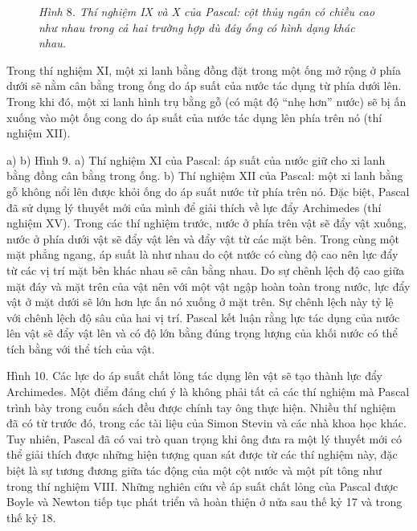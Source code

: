 \begin{multicols}{2}
\begin{figure}[H]
		\caption{\small\textit{\color{timhieukhoahoc}Hình $8$. Thí nghiệm IX và X của Pascal: cột thủy ngân có chiều cao như nhau trong cả hai trường hợp dù đáy ống có hình dạng khác nhau.}}
		\vspace*{-10pt}
	\end{figure}
	Trong thí nghiệm XI, một xi lanh bằng đồng đặt trong một ống mở rộng ở phía dưới sẽ nằm cân bằng trong ống do áp suất của nước tác dụng từ phía dưới lên. Trong khi đó, một xi lanh hình trụ bằng gỗ (có mật độ “nhẹ hơn” nước) sẽ bị ấn xuống vào một ống cong do áp suất của nước tác dụng lên phía trên nó (thí nghiệm XII). 
	
	a)					b)
	Hình 9. a) Thí nghiệm XI của Pascal: áp suất của nước giữ cho xi lanh bằng đồng cân bằng trong ống. b) Thí nghiệm XII của Pascal: một xi lanh bằng gỗ không nổi lên được khỏi ống do áp suất nước từ phía trên nó.
	Đặc biệt, Pascal đã sử dụng lý thuyết mới của mình để giải thích về lực đẩy Archimedes (thí nghiệm XV). Trong các thí nghiệm trước, nước ở phía trên vật sẽ đẩy vật xuống, nước ở phía dưới vật sẽ đẩy vật lên và đẩy vật từ các mặt bên. Trong cùng một mặt phẳng ngang, áp suất là như nhau do cột nước có cùng độ cao nên lực đẩy từ các vị trí mặt bên khác nhau sẽ cân bằng nhau. Do sự chênh lệch độ cao giữa mặt đáy và mặt trên của vật nên với một vật ngập hoàn toàn trong nước, lực đẩy vật ở mặt dưới sẽ lớn hơn lực ấn nó xuống ở mặt trên. Sự chênh lệch này tỷ lệ với chênh lệch độ sâu của hai vị trí. Pascal kết luận rằng lực tác dụng của nước lên vật sẽ đẩy vật lên và có độ lớn bằng đúng trọng lượng của khối nước có thể tích bằng với thể tích của vật.
	
	Hình 10. Các lực do áp suất chất lỏng tác dụng lên vật sẽ tạo thành lực đẩy Archimedes.
	Một điểm đáng chú ý là không phải tất cả các thí nghiệm mà Pascal trình bày trong cuốn sách đều được chính tay ông thực hiện. Nhiều thí nghiệm đã có từ trước đó, trong các tài liệu của Simon Stevin và các nhà khoa học khác. Tuy nhiên, Pascal đã có vai trò quan trọng khi ông đưa ra một lý  thuyết mới có thể giải thích được những hiện tượng quan sát được từ các thí nghiệm này, đặc biệt là sự tương đương giữa tác động của một cột nước và một pít tông như trong thí nghiệm VIII. Những nghiên cứu về áp suất chất lỏng của Pascal được Boyle và Newton tiếp tục phát triển và hoàn thiện ở nửa sau thế kỷ 17 và trong thế kỷ 18.
	

\end{multicols}
